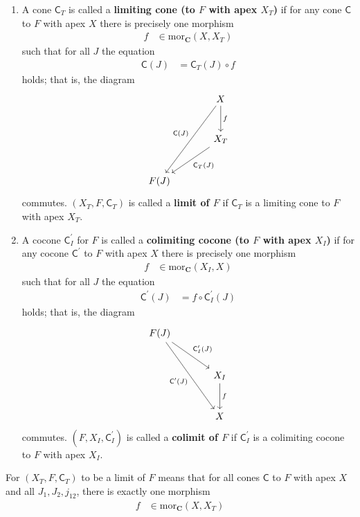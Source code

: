 \begin{enumerate}
\item[(U${}_{\blacktriangle}$)]
A cone $\mathsf{C}_{T}$ is called a \textbf{limiting cone (to $F$ with apex $X_{T}$)} if for any cone $\mathsf{C}$ to $F$ with apex $X$ there is precisely one morphism
\begin{align*}
  f
  &\in
  \mathrm{mor}_{\mathbf{C}}(X,X_{T})
\end{align*}
such that for all $J$ the equation
\begin{align*}
  \mathsf{C}(J)
  &=
  \mathsf{C}_{T}(J)
  \circ
  f
\end{align*}
holds; that is, the diagram
\[
\begin{tikzcd}[sep=large]
  &
  X
  \arrow{d}{f}
  \arrow[swap]{ddl}{\mathsf{C}(J)}
  \\
  &
  X_{T}
  \arrow{dl}{\mathsf{C}_{T}(J)}
  \\
  F(J)
\end{tikzcd}
\]
commutes.
$(X_{T},F,\mathsf{C}_{T})$ is called a \textbf{limit of $F$} if $\mathsf{C}_{T}$ is a limiting cone to $F$ with apex $X_{T}$.
\item[(U${}_{\blacktriangle^{\prime}}$)]
A cocone $\mathsf{C}_{I}^{\prime}$ for $F$ is called a \textbf{colimiting cocone (to $F$ with apex $X_{I}$)} if for any cocone $\mathsf{C}^{\prime}$ to $F$ with apex $X$ there is precisely one morphism
\begin{align*}
  f
  &\in
  \mathrm{mor}_{\mathbf{C}}(X_{I},X)
\end{align*}
such that for all $J$ the equation
\begin{align*}
  \mathsf{C}^{\prime}(J)
  &=
  f
  \circ
  \mathsf{C}_{I}^{\prime}(J)
\end{align*}
holds; that is, the diagram
\[
\begin{tikzcd}[sep=large]
  F(J)
  \arrow{dr}{\mathsf{C}_{I}^{\prime}(J)}
  \arrow[swap]{ddr}{\mathsf{C}^{\prime}(J)}
  &
  \\
  &
  X_{I}
  \arrow{d}{f}
  \\
  &
  X
\end{tikzcd}
\]
commutes.
$(F,X_{I},\mathsf{C}_{I}^{\prime})$ is called a \textbf{colimit of $F$} if $\mathsf{C}_{I}^{\prime}$ is a colimiting cocone to $F$ with apex $X_{I}$.
\end{enumerate}
For $(X_{T},F,\mathsf{C}_{T})$ to be a limit of $F$ means that for all cones $\mathsf{C}$ to $F$ with apex $X$ and all $J_{1},J_{2},j_{12}$, there is exactly one morphism
\begin{align*}
  f
  &\in
  \mathrm{mor}_{\mathbf{C}}(X,X_{T})
\end{align*}
